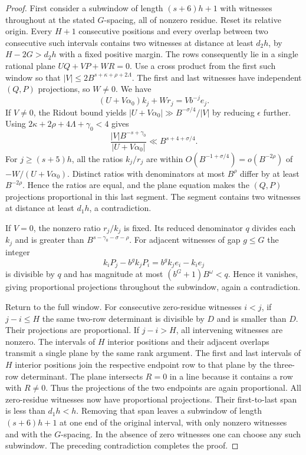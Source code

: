 \begin{proof}
First consider a subwindow of length \((s+6)h+1\) with witnesses
throughout at the stated \(G\)-spacing, all of nonzero residue. Reset
its relative origin. Every \(H+1\) consecutive positions and every
overlap between two consecutive such intervals contains two witnesses
at distance at least \(d_2h\), by \(H-2G>d_2h\) with a fixed positive
margin. The rows consequently lie in a single rational plane
\(UQ+VP+WR=0\). Use a cross product from the first such window so that
\(|V|\le 2B^{s+\kappa+\rho+2\Lambda}\). The first and last witnesses
have independent \((Q,P)\) projections, so \(W\ne0\). We have
\begin{equation}\label{eq:plane-phase}
 (U+V\alpha_0)k_j+Wr_j=V b^{-j} e_j .
\end{equation}
If \(V\ne0\), the Ridout bound yields
\(\left|U+V\alpha_0\right|\gg B^{-\sigma/4}/|V|\)
by reducing \(\epsilon\) further. Using
\(2\kappa+2\rho+4\Lambda+\gamma_0<4\) gives
\[
 \frac{|V|B^{-s+\gamma_0}}{|U+V\alpha_0|}
    \ll B^{s+4+\sigma/4}.
\]
For \(j\ge(s+5)h\), all the ratios \(k_j/r_j\) are within
\(O(B^{-1+\sigma/4})=o(B^{-2\rho})\) of
\(-W/(U+V\alpha_0)\). Distinct ratios with denominators at most
\(B^\rho\) differ by at least \(B^{-2\rho}\).
Hence the ratios are equal, and the plane equation makes the
\((Q,P)\) projections proportional in this last segment. The segment
contains two witnesses at distance at least \(d_1h\), a contradiction.

If \(V=0\), the nonzero ratio \(r_j/k_j\) is fixed. Its reduced
denominator \(q\) divides each \(k_j\) and is greater than
\(B^{s-\gamma_0-\sigma-\rho}\). For adjacent witnesses of gap
\(g\le G\) the integer
\[
 k_iP_j-b^g k_jP_i=b^g k_j e_i-k_i e_j
\]
is divisible by \(q\) and has magnitude at most
\((b^G+1)B^\omega<q\). Hence it vanishes, giving proportional
projections throughout the subwindow, again a contradiction.

Return to the full window. For consecutive zero-residue witnesses
\(i<j\), if \(j-i\le H\) the same two-row determinant is divisible by
\(D\) and is smaller than \(D\). Their projections are proportional.
If \(j-i>H\), all intervening witnesses are nonzero. The intervals of
\(H\) interior positions and their adjacent overlaps transmit a single
plane by the same rank argument. The first and last intervals of
\(H\) interior positions join the respective endpoint row to that plane
by the three-row determinant. The plane intersects \(R=0\) in a line
because it contains a row with \(R\ne0\). Thus the projections of the
two endpoints are again proportional. All zero-residue witnesses now
have proportional projections. Their first-to-last span is less
than \(d_1h<h\). Removing that span leaves a subwindow of length
\((s+6)h+1\) at one end of the original interval, with only nonzero
witnesses and with the \(G\)-spacing. In the absence of zero
witnesses one can choose any such subwindow. The preceding
contradiction completes the proof.
\end{proof}

